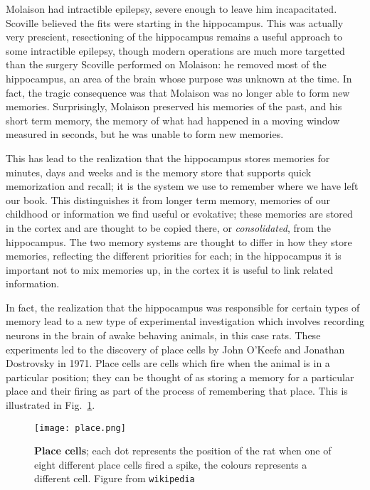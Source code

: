 \documentclass[12pt]{article}
\begin{document}
Molaison had intractible epilepsy, severe enough to leave him
incapacitated. Scoville believed the fits were starting in the
hippocampus. This was actually very prescient, resectioning of the
hippocampus remains a useful approach to some intractible epilepsy,
though modern operations are much more targetted than the surgery
Scoville performed on Molaison: he removed most of the hippocampus, an
area of the brain whose purpose was unknown at the time. In fact, the
tragic consequence was that Molaison was no longer able to form new
memories. Surprisingly, Molaison preserved his memories of the past,
and his short term memory, the memory of what had happened in a moving
window measured in seconds, but he was unable to form new
memories.

This has lead to the realization that the hippocampus stores memories
for minutes, days and weeks and is the memory store that supports
quick memorization and recall; it is the system we use to remember
where we have left our book. This distinguishes it from longer term
memory, memories of our childhood or information we find useful or
evokative; these memories are stored in the cortex and are thought to
be copied there, or \textsl{consolidated}, from the hippocampus. The
two memory systems are thought to differ in how they store memories,
reflecting the different priorities for each; in the hippocampus it is
important not to mix memories up, in the cortex it is useful to link
related information.

In fact, the realization that the hippocampus was responsible for
certain types of memory lead to a new type of experimental
investigation which involves recording neurons in the brain of awake
behaving animals, in this case rats. These experiments led to the
discovery of place cells by John O'Keefe and Jonathan Dostrovsky in
1971. Place cells are cells which fire when the animal is in a
particular position; they can be thought of as storing a memory for a
particular place and their firing as part of the process of
remembering that place. This is illustrated in Fig.~\ref{fig_place}.


\begin{figure}[tbhp]
  \begin{center}
  \texttt{[image: place.png]}
\end{center}
  \caption{\textbf{Place cells}; each dot represents the position of
    the rat when one of eight different place cells fired a spike, the
    colours represents a different cell. Figure from
    \texttt{wikipedia}\label{fig_place}}
\end{figure}
\end{document}
